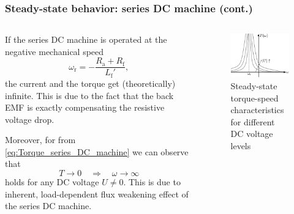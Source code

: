 \begin{frame}
	\frametitle{Steady-state behavior: series DC machine (cont.)}
	\begin{columns}
		\begin{column}{0.55\textwidth}
		If the series DC machine is operated at the negative mechanical speed
		\begin{equation}
			\omega_\mathrm{r} = -\frac{R_\mathrm{a} + R_\mathrm{f}}{L_\mathrm{f}'},
	   \end{equation}
	   the current and the torque get (theoretically) infinite. This is due to the fact that the back EMF is exactly compensating the resistive voltage drop.

	   Moreover, for from \eqref{eq:Torque_series_DC_machine} we can observe that
	   \begin{equation}
		 T \rightarrow 0 \quad \Rightarrow \quad \omega \rightarrow \infty
	   \end{equation}
	   holds for any DC voltage $U \neq 0$. This is due to inherent, load-dependent flux weakening effect of the series DC machine.
\end{column}
\hfill
\begin{column}{0.45\textwidth}
	\begin{figure}
		\centering
		\includegraphics[scale=1.1]{fig/lec03/Series_DC_machine_torque_speed.pdf}
		\caption{Steady-state torque-speed characteristics for different DC voltage levels}
		\label{fig:Series_DC_machine_torque_speed}
\end{figure}
\end{column}
\end{columns}
\end{frame}

